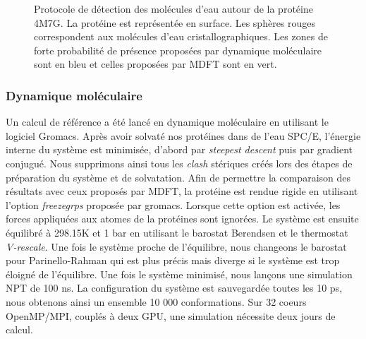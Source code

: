\begin{figure}[H]
      \caption[Protocole de détection des molécules d'eau autour de la protéine 4M7G.]{Protocole de détection des molécules d'eau autour de la protéine 4M7G. La protéine est représentée en surface. Les sphères rouges correspondent aux molécules d'eau cristallographiques. Les zones de forte probabilité de présence proposées par dynamique moléculaire sont en bleu et celles proposées par MDFT sont en vert.}
      \label{fig:water_molecule_protocol}
\end{figure}




\subsubsection{Dynamique moléculaire}
Un calcul de référence a été lancé en dynamique moléculaire en utilisant le logiciel Gromacs\cite{berendsen_gromacs:_1995}. Après avoir solvaté nos protéines dans de l'eau SPC/E, l'énergie interne du système est minimisée, d'abord par \textit{steepest descent} puis par gradient conjugué. Nous supprimons ainsi tous les \textit{clash} stériques créés lors des étapes de préparation du système et de solvatation. Afin de permettre la comparaison des résultats avec ceux proposés par MDFT, la protéine est rendue rigide en utilisant l'option \textit{freezegrps} proposée par gromacs. Lorsque cette option est activée, les forces appliquées aux atomes de la protéines sont ignorées. Le système est ensuite équilibré à 298.15K et 1 bar en utilisant le barostat Berendsen et le thermostat \textit{V-rescale}. Une fois le système proche de l'équilibre, nous changeons le barostat pour Parinello-Rahman qui est plus précis mais diverge si le système est trop éloigné de l'équilibre. Une fois le système minimisé, nous lançons une simulation NPT de 100 ns. La configuration du système est sauvegardée toutes les 10 ps, nous obtenons ainsi un ensemble 10 000 conformations. Sur 32 coeurs OpenMP/MPI, couplés à deux GPU, une simulation nécessite deux jours de calcul.

